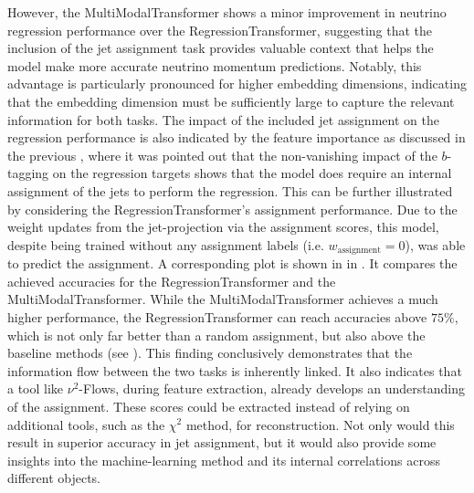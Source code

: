However, the MultiModalTransformer shows a minor improvement in neutrino regression performance over the RegressionTransformer, suggesting that the inclusion of the jet assignment task provides valuable context that helps the model make more accurate neutrino momentum predictions. Notably, this advantage is particularly pronounced for higher embedding dimensions, indicating that the embedding dimension must be sufficiently large to capture the relevant information for both tasks. The impact of the included jet assignment on the regression performance is also indicated by the feature importance as discussed in the previous , where it was pointed out that the non-vanishing impact of the $b$-tagging on the regression targets shows that the model does require an internal assignment of the jets to perform the regression.
This can be further illustrated by considering the RegressionTransformer's assignment performance. Due to the weight updates from the jet-projection via the assignment scores, this model, despite being trained without any assignment labels (i.e. $w_{\text{assignment}}=0$), was able to predict the assignment. A corresponding plot is shown in  in . It compares the achieved accuracies for the RegressionTransformer and the MultiModalTransformer. While the MultiModalTransformer achieves a much higher performance, the RegressionTransformer can reach accuracies above $75\%$, which is not only far better than a random assignment, but also above the baseline methods (see ). This finding conclusively demonstrates that the information flow between the two tasks is inherently linked. It also indicates that a tool like $\nu^2$-Flows, during feature extraction, already develops an understanding of the assignment. These scores could be extracted instead of relying on additional tools, such as the $\chi^2$ method, for reconstruction. Not only would this result in superior accuracy in jet assignment, but it would also provide some insights into the machine-learning method and its internal correlations across different objects.

